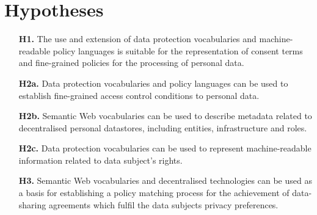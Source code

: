 \section{Hypotheses}
\label{sec:hypotheses}

\begin{enumerate}
    \item [\textbf{H1.}] The use and extension of data protection vocabularies and machine-readable policy languages is suitable for the representation of consent terms and fine-grained policies for the processing of personal data.
    \item [\textbf{H2a.}] Data protection vocabularies and policy languages can be used to establish fine-grained access control conditions to personal data.
    \item [\textbf{H2b.}] Semantic Web vocabularies can be used to describe metadata related to decentralised personal datastores, including entities, infrastructure and roles.
    \item [\textbf{H2c.}] Data protection vocabularies can be used to represent machine-readable information related to data subject's rights.
    \item [\textbf{H3.}] Semantic Web vocabularies and decentralised technologies can be used as a basis for establishing a policy matching process for the achievement of data-sharing agreements which fulfil the data subjects privacy preferences.
\end{enumerate}
